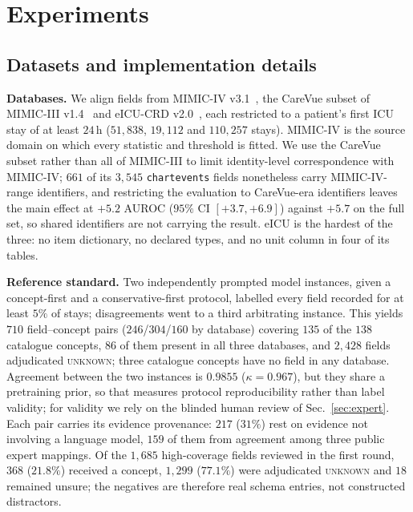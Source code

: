\section{Experiments}
\label{sec:exp}



\subsection{Datasets and implementation details}
\label{sec:data}

\noindent\textbf{Databases.}
We align fields from MIMIC-IV v3.1~\cite{mimiciv}, the CareVue subset of
MIMIC-III v1.4~\cite{mimiciii} and eICU-CRD v2.0~\cite{eicu}, each restricted to a
patient's first ICU stay of at least $24$\,h ($51{,}838$, $19{,}112$ and $110{,}257$
stays). MIMIC-IV is the source domain on which every statistic and threshold is fitted.
We use the CareVue subset rather than all of MIMIC-III to limit identity-level
correspondence with MIMIC-IV; $661$ of its $3{,}545$ \texttt{chartevents} fields
nonetheless carry MIMIC-IV-range identifiers, and restricting the evaluation to
CareVue-era identifiers leaves the main effect at $+5.2$ AUROC ($95\%$ CI
$[+3.7,+6.9]$) against $+5.7$ on the full set, so shared identifiers are not carrying the
result. eICU is the hardest of the three: no item dictionary, no declared types, and no
unit column in four of its tables.

\noindent\textbf{Reference standard.}
Two independently prompted model instances, given a concept-first and a
conservative-first protocol, labelled every field recorded for at least $5\%$ of stays;
disagreements went to a third arbitrating instance. This yields $710$ field--concept
pairs ($246$/$304$/$160$ by database) covering $135$ of the $138$ catalogue concepts,
$86$ of them present in all three databases, and $2{,}428$ fields adjudicated
\textsc{unknown}; three catalogue concepts have no field in any database. Agreement
between the two instances is $0.9855$ ($\kappa{=}0.967$), but they share a pretraining
prior, so that measures protocol reproducibility rather than label validity; for validity
we rely on the blinded human review of Sec.~\ref{sec:expert}. Each pair carries its
evidence provenance: $217$ ($31\%$) rest on evidence not involving a language model,
$159$ of them from agreement among three public expert mappings. Of the $1{,}685$
high-coverage fields reviewed in the first round, $368$ ($21.8\%$) received a concept,
$1{,}299$ ($77.1\%$) were adjudicated \textsc{unknown} and $18$ remained unsure; the
negatives are therefore real schema entries, not constructed distractors.

